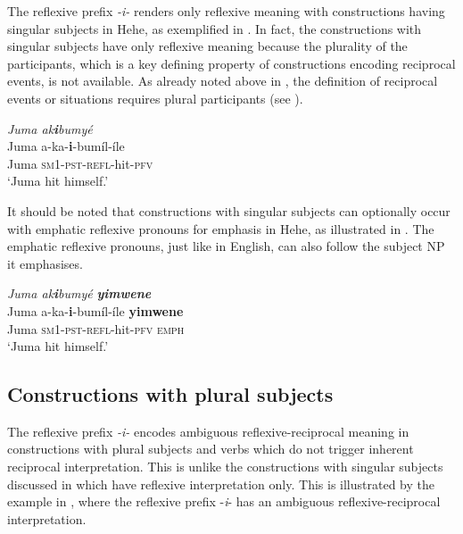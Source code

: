 \documentclass[output=paper,
            colorlinks, citecolor=brown
            ,draftmode
		  ]{langscibook}
\begin{document}
The reflexive prefix \textit{{}-i-} renders only reflexive meaning with constructions having singular subjects in Hehe, as exemplified in . In fact, the constructions with singular subjects have only reflexive meaning because the plurality of the participants, which is a key defining property of constructions encoding reciprocal events, is not available. As already noted above in , the definition of reciprocal events or situations requires plural participants (see \citealt{Frajzyngier2000, HeineMiyashita2008, Lichtenberk2000}).


\ea\label{ex:ngwasi:10}
\textit{Juma ak}\textbf{\textit{i}}\textit{bumyé}\footnotemark{}\\
\gll Juma   a-ka-\textbf{i}{}-bumíl-íle\\
Juma   \textsc{sm1-pst-refl}-hit-\textsc{pfv}\\
\glt ‘Juma hit himself.’
\z
{}

It should be noted that constructions with singular subjects can optionally occur with emphatic reflexive pronouns for emphasis in Hehe, as illustrated in . The emphatic reflexive pronouns, just like in English, can also follow the subject NP it emphasises.

\ea\label{ex:ngwasi:11}
\textit{Juma ak}\textbf{\textit{i}}\textit{bumyé} \textbf{\textit{yimwene}}\\
\gll Juma   a-ka-\textbf{i}{}-bumíl-íle    \textbf{yimwene}\\
Juma   \textsc{sm1-pst-refl}-hit-\textsc{pfv}  \textsc{emph}\\
\glt ‘Juma hit himself.’
\z


\subsection{Constructions with plural subjects}\label{sec:ngwasi:2.3}

The reflexive prefix \textit{{}-i-} encodes ambiguous reflexive-reciprocal meaning in constructions with plural subjects and verbs which do not trigger inherent reciprocal interpretation. This is unlike the constructions with singular subjects discussed in  which have reflexive interpretation only. This is illustrated by the example in , where the reflexive prefix -\textit{i}{}- has an ambiguous reflexive\nobreakdash-reciprocal interpretation.
\end{document}

